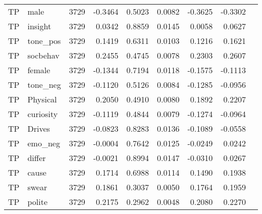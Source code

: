 \begin{longtable}{@{}llrrrrrrr@{}}
TP & male & 3729 & -0.3464 & 0.5023 & 0.0082 & -0.3625 & -0.3302 \\
TP & insight & 3729 & 0.0342 & 0.8859 & 0.0145 & 0.0058 & 0.0627 \\
TP & tone\_pos & 3729 & 0.1419 & 0.6311 & 0.0103 & 0.1216 & 0.1621 \\
TP & socbehav & 3729 & 0.2455 & 0.4745 & 0.0078 & 0.2303 & 0.2607 \\
TP & female & 3729 & -0.1344 & 0.7194 & 0.0118 & -0.1575 & -0.1113 \\
TP & tone\_neg & 3729 & -0.1120 & 0.5126 & 0.0084 & -0.1285 & -0.0956 \\
TP & Physical & 3729 & 0.2050 & 0.4910 & 0.0080 & 0.1892 & 0.2207 \\
TP & curiosity & 3729 & -0.1119 & 0.4844 & 0.0079 & -0.1274 & -0.0964 \\
TP & Drives & 3729 & -0.0823 & 0.8283 & 0.0136 & -0.1089 & -0.0558 \\
TP & emo\_neg & 3729 & -0.0004 & 0.7642 & 0.0125 & -0.0249 & 0.0242 \\
TP & differ & 3729 & -0.0021 & 0.8994 & 0.0147 & -0.0310 & 0.0267 \\
TP & cause & 3729 & 0.1714 & 0.6988 & 0.0114 & 0.1490 & 0.1938 \\
TP & swear & 3729 & 0.1861 & 0.3037 & 0.0050 & 0.1764 & 0.1959 \\
TP & polite & 3729 & 0.2175 & 0.2962 & 0.0048 & 0.2080 & 0.2270 \\
\end{longtable}
\endgroup
